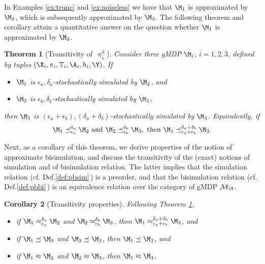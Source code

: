 \documentclass[letterpaper, 10 pt, conference]{amsart}
\newtheorem{theorem}{Theorem}
\newtheorem{cor}[theorem]{Corollary}
\theoremstyle{definition}
\theoremstyle{example}
\theoremstyle{remark}
\newcommand{\eps}{\epsilon}
\begin{document}
\noindent In Examples \ref{ex:trunc} and \ref{ex:noiseless} we have that $\M_1$ is approximated by $\M_2$, which is subsequently approximated by $\M_3$. The following theorem and corollary attain a quantitative answer on the question whether $\M_1$ is approximated by $\M_3$.
 \begin{theorem}[Transitivity of $\preceq_{\eps}^\delta$]\label{thm:prop}
Consider three gMDP $\M_i$, $i=1,2,3$, defined by tuples $(\X_i,\pi_i ,\mathbb T_i,\A_i,h_i,\Y)$. 
If  \begin{itemize}
\item $\M_1$ is $\epsilon_a,\delta_a$-stochastically simulated by $\M_2$, and
\item $\M_2$ is $\epsilon_b,\delta_b$-stochastically simulated by $\M_3$, 
\end{itemize}\noindent then
$\M_1$ is $(\epsilon_a+\epsilon_b),(\delta_a+\delta_b)$-stochastically simulated by $\M_3$. 
Equivalently, if 
\begin{align*}\M_1\preceq^{\delta_a}_{\epsilon_a}\M_2 \textmd{ and }\M_2\preceq^{\delta_b}_{\epsilon_b}\M_3, \textmd{ then }\M_1\preceq^{ \cramped{\delta_a+\delta_b}}_{ \cramped{\epsilon_a+\epsilon_b}}\M_3.\end{align*}
 \end{theorem}
Next, as a corollary of this theorem, 
we derive properties of the notion of approximate bisimulation, 
and discuss the transitivity of the (exact) notions of simulation and of bisimulation relation. 
The latter implies that the simulation relation (cf. Def.\ref{def:pbsim}\,) is a preorder, and that the bisimulation relation (cf. Def.\ref{def:pbbi}\,) is an equivalence relation over the category of gMDP $\mathcal M_\Y$.\begin{cor}[Transitivity properties]\label{cor:prop}
Following Theorem \ref{thm:prop}, 
 \begin{itemize} 
 \item 
if $\M_1\approx^{\delta_a}_{\epsilon_a}\M_2$ and $\M_2\approx^{\delta_b}_{\epsilon_b}\M_3$, 
then $\M_1\approx^{ \cramped{\delta_a+\delta_b}}_{ \cramped{\epsilon_a+\epsilon_b}}\M_3$, and 
 \item 
if $\M_1\preceq \M_2$ and $\M_2\preceq \M_3$, then $\M_1\preceq\M_3$, and 
 \item 
if $\M_1\approx \M_2$ and $\M_2\approx \M_3$, then $\M_1\approx \M_3$. 
 \end{itemize}\end{cor}
\end{document}
